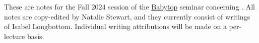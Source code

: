 \documentclass[10pt]{amsart}
\begin{document}
\maketitle

These are notes for the Fall 2024 session of the \href{https://math.mit.edu/topology/babytop/index.html}{Babytop} seminar concerning \cite{HHR}.
All notes are copy-edited by Natalie Stewart, and they currently consist of writings of Isabel Longbottom. 
Individual writing attributions will be made on a per-lecture basis. 

\toc

\newpage

   
\printbibliography
\end{document}
